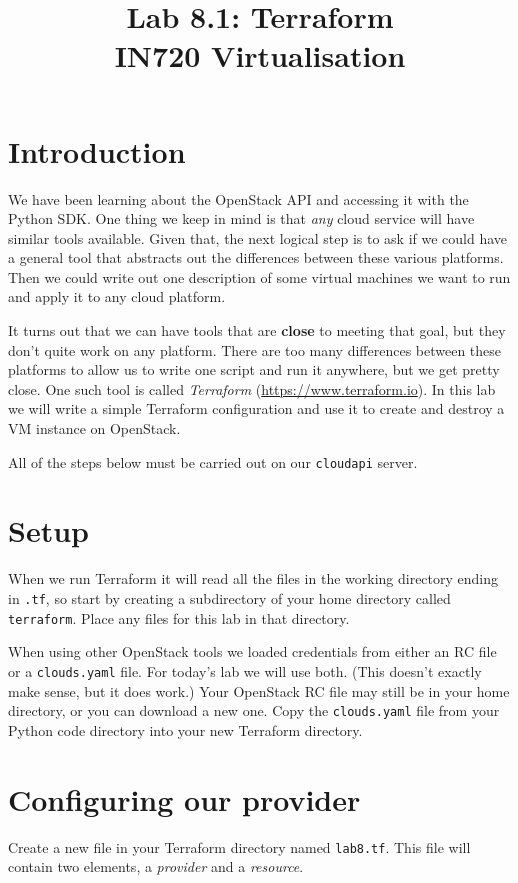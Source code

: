 \documentclass{article}
\begin{document}
\title{Lab 8.1: Terraform \\ IN720 Virtualisation}
\date{}
\maketitle

\section*{Introduction}
We have been learning about the OpenStack API and accessing it with the 
Python SDK. One thing we keep in mind is that \emph{any} cloud service 
will have similar tools available. Given that, the next logical step is
to ask if we could have a general tool that abstracts out the differences
between these various platforms. Then we could write out one description of
some virtual machines we want to run and apply it to any cloud platform.

It turns out that we can have tools that are \textbf{close} to meeting that
goal, but they don't quite work on any platform. There are too many differences
between these platforms to allow us to write one script and run it anywhere, 
but we get pretty close. One such tool is called \emph{Terraform} 
(\url{https://www.terraform.io}). In this lab we will write a simple Terraform
configuration and use it to create and destroy a VM instance on OpenStack.

All of the steps below must be carried out on our \texttt{cloudapi} server.

\section{Setup}
When we run Terraform it will read all the files in the working directory
ending in \texttt{.tf}, so start by creating a subdirectory of your home 
directory called \texttt{terraform}. Place any files for this lab in that 
directory.

When using other OpenStack tools we loaded credentials from either an
RC file or a \texttt{clouds.yaml} file. For today's lab we will use
both. (This doesn't exactly make sense, but it does work.) Your OpenStack RC file 
may still be in your home directory, or you can download a new one. Copy the 
\texttt{clouds.yaml} file from your Python code directory into your new Terraform 
directory.

\section{Configuring our provider}
Create a new file in your Terraform directory named \texttt{lab8.tf}. This file 
will contain two elements, a \emph{provider} and a \emph{resource}.
\end{document}

